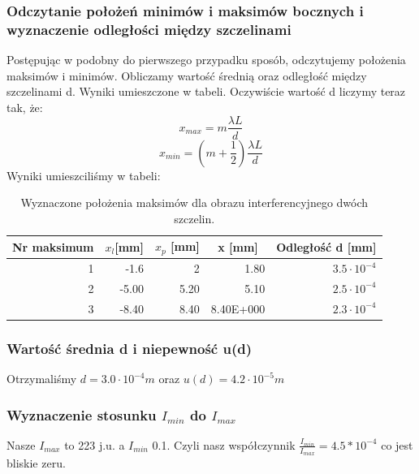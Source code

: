 \documentclass{article}
\begin{document}
\subsubsection{Odczytanie położeń minimów i maksimów bocznych i wyznaczenie odległości między szczelinami}
Postępując w podobny do pierwszego przypadku sposób, odczytujemy położenia maksimów i minimów. Obliczamy wartość średnią oraz  odległość między szczelinami d. Wyniki umieszczone w tabeli. Oczywiście wartość d liczymy teraz tak, że:
\begin{equation}
x_{max} = m \frac{\lambda L}{d}
\end{equation}
\begin{equation}
x_{min} = (m+\frac{1}{2}) \frac{\lambda L}{d}
\end{equation}
Wyniki umieszciliśmy w tabeli:
\begin{table}[htbp]
\centering
\begin{tabular}{|r|r|r|r|r|}
\hline
\multicolumn{1}{|c|}{\textbf{Nr maksimum}} & \multicolumn{1}{c|}{\textbf{$x_{l}$[mm]}} & \multicolumn{1}{c|}{\textbf{$x_{p}$ [mm]}} & \multicolumn{1}{c|}{\textbf{x [mm]}} & \multicolumn{1}{c|}{\textbf{Odległość d [mm]}} \\ \hline
1 & -1.6 & 2 & 1.80 & $3.5 \cdot 10^{-4}$ \\ \hline
2 & -5.00 & 5.20 & 5.10 & $2.5 \cdot 10^{-4}$ \\ \hline
3 & -8.40 & 8.40 & 8.40E+000 & $2.3 \cdot 10^{-4}$ \\ \hline
\end{tabular}
\caption{Wyznaczone położenia maksimów dla obrazu interferencyjnego dwóch szczelin.}
\label{}
\end{table}

\subsubsection{Wartość średnia d i niepewność u(d)}
Otrzymaliśmy $d = 3.0 \cdot 10^{-4} m$ oraz $u(d) = 4.2 \cdot 10^{-5} m$
\subsubsection{Wyznaczenie stosunku $I_{min}$ do $I_{max}$}
Nasze $I_{max}$ to 223 j.u. a $I_{min}$ 0.1. Czyli nasz współczynnik $\frac{I_{min}}{I_{max}} = 4.5*10^{-4}$ co jest bliskie zeru.


\end{document}
